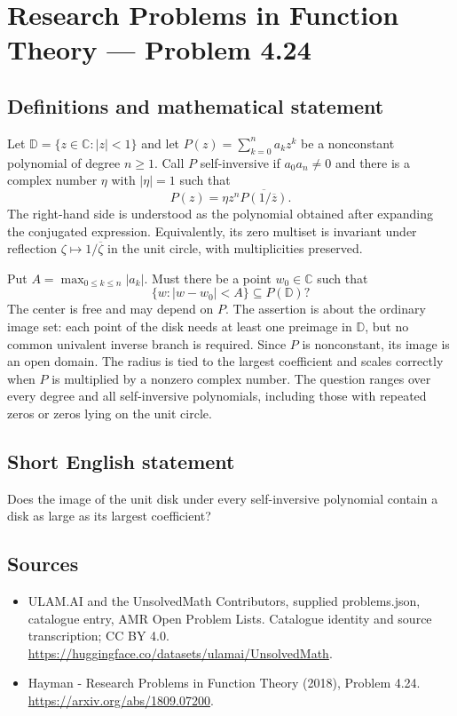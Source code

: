 \documentclass[11pt,a4paper]{article}
\begin{document}
\section*{Research Problems in Function Theory — Problem 4.24}\label{statement}

\subsection{Definitions and mathematical statement}
Let $\mathbb D=\{z\in\mathbb C:|z|<1\}$ and let
$P(z)=\sum_{k=0}^{n}a_kz^k$ be a nonconstant polynomial of degree
$n\geq1$. Call $P$ self-inversive if $a_0a_n\ne0$ and there is a
complex number $\eta$ with $|\eta|=1$ such that
\[
 P(z)=\eta z^n\overline{P(1/\overline z)}.
\]
The right-hand side is understood as the polynomial obtained after
expanding the conjugated expression. Equivalently, its zero multiset
is invariant under reflection $\zeta\mapsto1/\overline\zeta$ in the
unit circle, with multiplicities preserved.

Put $A=\max_{0\leq k\leq n}|a_k|$. Must there be a point $w_0\in
\mathbb C$ such that
\[
 \{w:|w-w_0|<A\}\subseteq P(\mathbb D)?
\]
The center is free and may depend on $P$. The assertion is about
the ordinary image set: each point of the disk needs at least one
preimage in $\mathbb D$, but no common univalent inverse branch is
required. Since $P$ is nonconstant, its image is an open domain.
The radius is tied to the largest coefficient and scales correctly
when $P$ is multiplied by a nonzero complex number.
The question ranges over every degree and all self-inversive
polynomials, including those with repeated zeros or zeros lying
on the unit circle.
\subsection{Short English statement}
Does the image of the unit disk under every self-inversive polynomial contain a disk as large as its largest coefficient?
\subsection{Sources}
\begin{itemize}
\item[S1] ULAM.AI and the UnsolvedMath Contributors, supplied problems.json, catalogue entry, AMR Open Problem Lists. Catalogue identity and source transcription; CC BY 4.0.
\url{https://huggingface.co/datasets/ulamai/UnsolvedMath}.
\item[S2] Hayman - Research Problems in Function Theory (2018), Problem 4.24. 
\url{https://arxiv.org/abs/1809.07200}.
\end{itemize}
\end{document}
